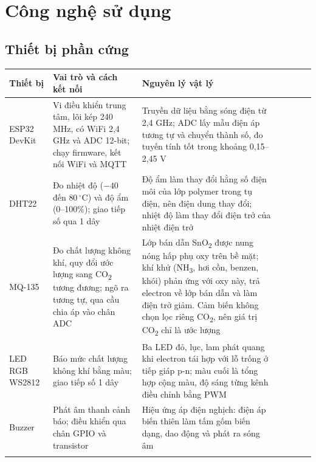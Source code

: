 \documentclass[12pt,a4paper]{article}
\newcommand{\outerline}{\Xhline{0.9pt}}
\begin{document}
\noindent\begin{minipage}{\linewidth}
\setlength{\parskip}{6pt}
\section{Công nghệ sử dụng}
\subsection{Thiết bị phần cứng}
\begin{tabularx}{\linewidth}{I L{2.3cm} i L{4.4cm} i Y I}
\outerline
\textbf{Thiết bị} & \textbf{Vai trò và cách kết nối} & \textbf{Nguyên lý vật lý} \\
\hline
ESP32 DevKit & Vi điều khiển trung tâm, lõi kép 240 MHz, có WiFi 2,4 GHz và ADC 12-bit; chạy firmware, kết nối WiFi và MQTT & Truyền dữ liệu bằng sóng điện từ 2,4 GHz; ADC lấy mẫu điện áp tương tự và chuyển thành số, đo tuyến tính tốt trong khoảng 0,15--2,45 V \\
\hline
DHT22 & Đo nhiệt độ ($-40$ đến $80\,^{\circ}$C) và độ ẩm (0--100\%); giao tiếp số qua 1 dây & Độ ẩm làm thay đổi hằng số điện môi của lớp polymer trong tụ điện, nên điện dung thay đổi; nhiệt độ làm thay đổi điện trở của nhiệt điện trở \\
\hline
MQ-135 & Đo chất lượng không khí, quy đổi ước lượng sang CO\textsubscript{2} tương đương; ngõ ra tương tự, qua cầu chia áp vào chân ADC & Lớp bán dẫn SnO\textsubscript{2} được nung nóng hấp phụ oxy trên bề mặt; khí khử (NH\textsubscript{3}, hơi cồn, benzen, khói) phản ứng với oxy này, trả electron về lớp bán dẫn và làm điện trở giảm. Cảm biến không chọn lọc riêng CO\textsubscript{2}, nên giá trị CO\textsubscript{2} chỉ là ước lượng \\
\hline
LED RGB WS2812 & Báo mức chất lượng không khí bằng màu; giao tiếp số 1 dây & Ba LED đỏ, lục, lam phát quang khi electron tái hợp với lỗ trống ở tiếp giáp p-n; màu cuối là tổng hợp cộng màu, độ sáng từng kênh điều chỉnh bằng PWM \\
\hline
Buzzer & Phát âm thanh cảnh báo; điều khiển qua chân GPIO và transistor & Hiệu ứng áp điện nghịch: điện áp biến thiên làm tấm gốm biến dạng, dao động và phát ra sóng âm \\
\outerline
\end{tabularx}
\end{minipage}
\par\bigskip
\end{document}
